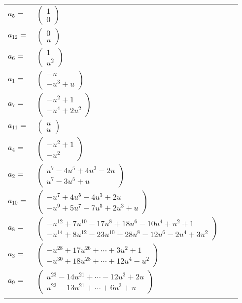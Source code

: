 \documentclass[1p]{elsarticle_modified}
\theoremstyle{definition}
\begin{document}
\begin{tabular}{m{7pt} m{180pt} m{7pt} m{180pt} }
\flushright $a_{5}=$&$\begin{pmatrix}1\\0\end{pmatrix}$ \\
\flushright $a_{12}=$&$\begin{pmatrix}0\\u\end{pmatrix}$ \\
\flushright $a_{6}=$&$\begin{pmatrix}1\\u^2\end{pmatrix}$ \\
\flushright $a_{1}=$&$\begin{pmatrix}- u\\- u^3+u\end{pmatrix}$ \\
\flushright $a_{7}=$&$\begin{pmatrix}- u^2+1\\- u^4+2 u^2\end{pmatrix}$ \\
\flushright $a_{11}=$&$\begin{pmatrix}u\\u\end{pmatrix}$ \\
\flushright $a_{4}=$&$\begin{pmatrix}- u^2+1\\- u^2\end{pmatrix}$ \\
\flushright $a_{2}=$&$\begin{pmatrix}u^7-4 u^5+4 u^3-2 u\\u^7-3 u^5+u\end{pmatrix}$ \\
\flushright $a_{10}=$&$\begin{pmatrix}- u^7+4 u^5-4 u^3+2 u\\- u^9+5 u^7-7 u^5+2 u^3+u\end{pmatrix}$ \\
\flushright $a_{8}=$&$\begin{pmatrix}- u^{12}+7 u^{10}-17 u^8+18 u^6-10 u^4+u^2+1\\- u^{14}+8 u^{12}-23 u^{10}+28 u^8-12 u^6-2 u^4+3 u^2\end{pmatrix}$ \\
\flushright $a_{3}=$&$\begin{pmatrix}- u^{28}+17 u^{26}+\cdots+3 u^2+1\\- u^{30}+18 u^{28}+\cdots+12 u^4- u^2\end{pmatrix}$ \\
\flushright $a_{9}=$&$\begin{pmatrix}u^{23}-14 u^{21}+\cdots-12 u^3+2 u\\u^{23}-13 u^{21}+\cdots+6 u^3+u\end{pmatrix}$\\&\end{tabular}
\end{document}
